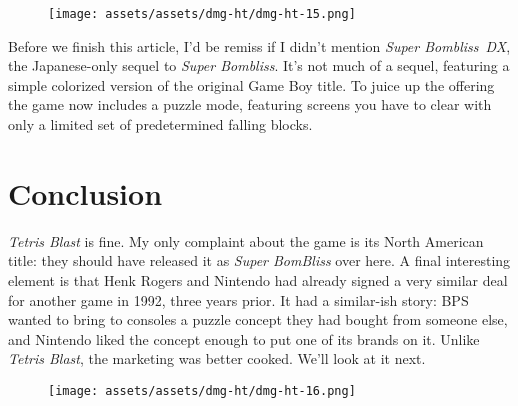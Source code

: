 \documentclass{book}
\begin{document}
\begin{figure}[hbt]
\vskip 10pt
\centering \texttt{[image: assets/assets/dmg-ht/dmg-ht-15.png]}
\vskip 6pt
\end{figure}
Before we finish this article, I’d be remiss if I didn’t mention \emph{Super Bombliss DX}, the Japanese-only sequel to \emph{Super Bombliss}. It’s not much of a sequel, featuring a simple colorized version of the original Game Boy title. To juice up the offering the game now includes a puzzle mode, featuring screens you have to clear with only a limited set of predetermined falling blocks.

\FloatBarrier\needspace{10mm}\section*{Conclusion}\nopagebreak[4]

\emph{Tetris Blast} is fine. My only complaint about the game is its North American title: they should have released it as \emph{Super BomBliss} over here. A final interesting element is that Henk Rogers and Nintendo had already signed a very similar deal for another game in 1992, three years prior. It had a similar-ish story: BPS wanted to bring to consoles a puzzle concept they had bought from someone else, and Nintendo liked the concept enough to put one of its brands on it. Unlike \emph{Tetris Blast}, the marketing was better cooked. We’ll look at it next.

\begin{figure}[hbt]
\vskip 10pt
\centering \texttt{[image: assets/assets/dmg-ht/dmg-ht-16.png]}
\vskip 6pt
\end{figure}
\end{document}
